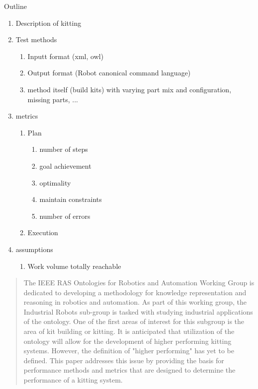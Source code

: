 



\begin {center}
{\huge{Outline}}
\end {center}

\begin{enumerate}
\item Description of kitting
\item Test methods
	\begin{enumerate}
	\item Inputt format (xml, owl)
	\item Output format (Robot canonical command language)
	\item method itself (build kits) with varying part mix and configuration, missing parts, ...
	\end{enumerate}
\item metrics
	\begin{enumerate}
	\item Plan
		\begin{enumerate}
		\item number of steps
		\item goal achievement
		\item optimality
		\item maintain constraints
		\item number of errors
		\end {enumerate}
	\item Execution
	\end {enumerate}
\item assumptions
	\begin {enumerate}
	\item Work volume totally reachable
	\end {enumerate}
\end{enumerate}


\maketitle
\thispagestyle{empty}
\pagestyle{empty}


\begin{abstract}

The IEEE RAS Ontologies for Robotics and Automation Working Group is dedicated to developing a methodology for knowledge representation and reasoning in robotics and automation. As part of this working group, the Industrial Robots sub-group is tasked with studying industrial applications of the ontology. One of the first areas of interest for this subgroup is the area of kit building or kitting. It is anticipated that
utilization of the ontology will allow for the development of higher performing kitting systems. However, the definition of "higher performing"
has yet to be defined. This paper addresses this issue by providing the basis for performance methods and metrics that are designed to
determine the performance of a kitting system.
\end{abstract}


